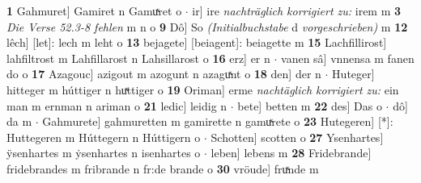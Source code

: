 \documentclass[8pt,a4paper,notitlepage]{article}
\begin{document}
\begin{table}[ht]
\begin{minipage}[t]{0.5\linewidth}
\textbf{1} Gahmuret] Gamiret n Gamuͯret o  $\cdot$ ir] ire \textit{nachträglich korrigiert zu:} irem m \textbf{3} \textit{Die Verse 52.3-8 fehlen} m n o  \textbf{9} Dô] So \textit{(Initialbuchstabe }d \textit{vorgeschrieben)} m \textbf{12} lêch] [let]: lech m leht o \textbf{13} bejagete] [beiagent]: beiagette m \textbf{15} Lachfillirost] lahfiltrost m Lahfillarost n Lahsillarost o \textbf{16} erz] er n  $\cdot$ vanen sâ] vnnensa m fanen do o \textbf{17} Azagouc] azigout m azogunt n azaguͯnt o \textbf{18} den] der n  $\cdot$ Huteger] hitteger m húttiger n huͯttiger o \textbf{19} Oriman] erme \textit{nachtäglich korrigiert zu:} ein man m ernman n ariman o \textbf{21} ledic] leidig n  $\cdot$ bete] betten m \textbf{22} des] Das o  $\cdot$ dô] da m  $\cdot$ Gahmurete] gahmuretten m gamirette n gamuͯrete o \textbf{23} Hutegeren] [*]: Huttegeren m Húttegern n Húttigern o  $\cdot$ Schotten] scotten o \textbf{27} Ysenhartes] ÿsenhartes m ẏsenhartes n isenhartes o  $\cdot$ leben] lebens m \textbf{28} Fridebrande] fridebrandes m fribrande n fr:de brande o \textbf{30} vröude] fruͯnde m \newline
\end{minipage}
\end{table}
\newpage
\end{document}
